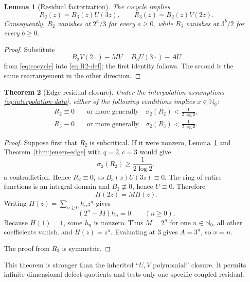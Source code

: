 \documentclass[11pt]{article}
\newtheorem{theorem}{Theorem}[section]
\newtheorem{lemma}[theorem]{Lemma}
\theoremstyle{definition}
\newcommand{\Nzero}{\mathbb N_0}
\begin{document}
\begin{lemma}[Residual factorization]\label{lem:residual-factorization}
The cocycle implies
\begin{equation}\label{eq:residual-factorizations}
  R_2(z)=B_3(z)U(3z),
  \qquad
  R_3(z)=B_2(z)V(2z).
\end{equation}
Consequently, \(R_2\) vanishes at \(2^a/3\) for every \(a\ge0\), while \(R_3\) vanishes at \(3^b/2\) for every \(b\ge0\).
\end{lemma}

\begin{proof}
Substitute
\[
  B_2V(2\cdot)-MV=B_3U(3\cdot)-AU
\]
from \eqref{eq:cocycle} into \eqref{eq:R2-def}; the first identity follows.  The second is the same rearrangement in the other direction.
\end{proof}

\begin{theorem}[Edge-residual closure]\label{thm:residual-closure}
Under the interpolation assumptions \eqref{eq:interpolation-data}, either of the following conditions implies \(x\in\Nzero\):
\begin{align}
  R_2\equiv0
  &\quad\text{or more generally}\quad
  \sigma_2(R_2)<\frac1{2\log2},\label{eq:R2-close}\\
  R_3\equiv0
  &\quad\text{or more generally}\quad
  \sigma_2(R_3)<\frac1{2\log3}.
  \label{eq:R3-close}
\end{align}
\end{theorem}

\begin{proof}
Suppose first that \(R_2\) is subcritical.  If it were nonzero, Lemma~\ref{lem:residual-factorization} and Theorem~\ref{thm:jensen-edge} with \(q=2,c=3\) would give
\[
  \sigma_2(R_2)\ge\frac1{2\log2},
\]
a contradiction.  Hence \(R_2\equiv0\), so \(B_3(z)U(3z)\equiv0\).  The ring of entire functions is an integral domain and \(B_3\not\equiv0\), hence \(U\equiv0\).  Therefore
\[
  H(2z)=M H(z).
\]
Writing \(H(z)=\sum_{n\ge0}h_nz^n\) gives
\[
  (2^n-M)h_n=0\qquad(n\ge0).
\]
Because \(H(1)=1\), some \(h_n\) is nonzero.  Thus \(M=2^n\) for one \(n\in\Nzero\), all other coefficients vanish, and \(H(z)=z^n\).  Evaluating at \(3\) gives \(A=3^n\), so \(x=n\).

The proof from \(R_3\) is symmetric.
\end{proof}

This theorem is stronger than the inherited ``\(U,V\) polynomial'' closure.  It permits infinite-dimensional defect quotients and tests only one specific coupled residual.
\end{document}
